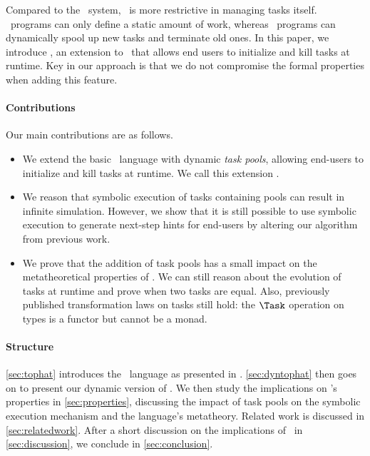 Compared to the \ITASKS\ system, \TOPHAT\ is more restrictive in managing tasks itself.
\TOPHAT\ programs can only define a static amount of work, whereas \ITASKS\ programs can dynamically spool up new tasks and terminate old ones.
In this paper, we introduce \DYNTOPHAT, an extension to \TOPHAT\ that allows end users to initialize and kill tasks at runtime.
Key in our approach is that we do not compromise the formal properties when adding this feature.

\paragraph{Contributions}

Our main contributions are as follows.
\begin{itemize}
  \item
    We extend the basic \TOPHAT\ language with dynamic \emph{task pools},
    allowing end-users to initialize and kill tasks at runtime.
    We call this extension \DYNTOPHAT.
  \item
    We reason that symbolic execution of tasks containing pools can result in infinite simulation.
    However, we show that it is still possible to use symbolic execution to generate next-step hints for end-users
    by altering our algorithm from previous work.
  \item
    We prove that the addition of task pools has a small impact on the metatheoretical properties of \TOPHAT.
    We can still reason about the evolution of tasks at runtime
    and prove when two tasks are equal.
    Also, previously published transformation laws on tasks still hold:
    the $\Task$ operation on types is a functor but cannot be a monad.
\end{itemize}


\paragraph{Structure}

\cref{sec:tophat} introduces the \TOPHAT\ language as presented in \citet{Steenvoorden22}.
\cref{sec:dyntophat} then goes on to present our dynamic version of \TOPHAT.
We then study the implications on \TOPHAT's properties in \cref{sec:properties},
discussing the impact of task pools on the symbolic execution mechanism and the language's metatheory.
Related work is discussed in \cref{sec:relatedwork}.
After a short discussion on the implications of \DYNTOPHAT\ in \cref{sec:discussion},
we conclude in \cref{sec:conclusion}.
